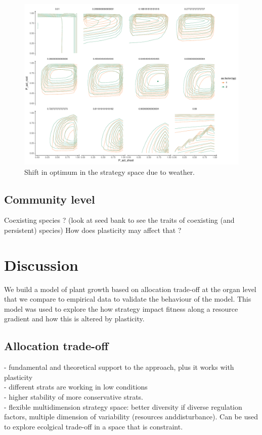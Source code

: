 \documentclass[review]{elsarticle}
\begin{document}
\begin{figure}
\includegraphics[width = \textwidth]{./Figures/optimum_shifting_weather_10034.pdf}
\caption{Shift in optimum in the strategy space due to weather.}
\end{figure}

\subsection{Community level}

Coexisting species ? (look at seed bank to see the traits of coexisting (and persistent) species)
How does plasticity may affect that ?


\section{Discussion}
We build a model of plant growth based on allocation trade-off at the organ level that we compare to empirical data to validate the behaviour of the model. This model was used to explore the how strategy impact fitness along a resource gradient and how this is altered by plasticity.
 
\subsection{Allocation trade-off}
- fundamental and theoretical support to the approach, plus it works with plasticity\\
- different strats are working in low conditions\\
- higher stability of more conservative strats.\\
- flexible multidimension strategy space: better diversity if diverse regulation factors, multiple dimension of variability (resources anddisturbance). Can be used to explore ecolgical trade-off in a space that is constraint.
\end{document}
